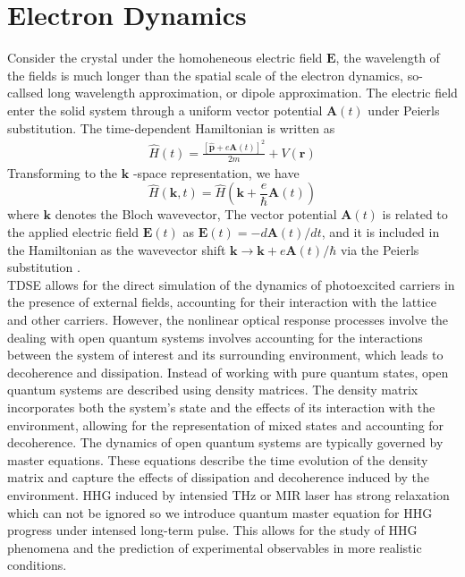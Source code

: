 \section{Electron Dynamics}
Consider the crystal under the homoheneous electric field $\mathbf {E}$, the wavelength of the fields
is much longer than the spatial scale of the electron dynamics, so-callsed long wavelength approximation, or dipole approximation. The electric field enter the solid system through a uniform
vector potential $\mathbf {A} (t)$ under Peierls substitution\cite{hofstadter1976energy}. The time-dependent Hamiltonian is written as
\begin{align}
	\hat{H}(t)=\frac{[\hat{\mathbf{p}}+e \mathbf{A}(t)]^{2}}{2 m}+V(\mathbf{r})
\end{align}
Transforming to the $\mathbf{k}$ -space representation, we have
\begin{equation}
	\hat{H}(\mathbf{k}, t)=\hat{H}\left(\mathbf{k}+\frac{e}{\hbar} \mathbf{A}(t)\right)
	\label{eqn:vTD}
\end{equation}
where $\mathbf k$ denotes the Bloch wavevector, The vector potential $\mathbf A(t)$ is related to the applied electric field $\mathbf E(t)$ as $\mathbf E(t)=-d\mathbf A(t)/dt$, and it is included in the Hamiltonian as the wavevector shift $\mathbf k \rightarrow \mathbf k + e\mathbf A(t)/\hbar$ via the Peierls substitution  \cite{hofstadter1976energy}.\\
\color{red}
\gls{TDSE} allows for the direct simulation of the dynamics of photoexcited carriers in the presence of external fields, accounting for their interaction with the lattice and other carriers.
However, the nonlinear optical response processes involve the dealing with open quantum systems involves accounting for the interactions between the system of interest and its surrounding environment, which leads to decoherence and dissipation. Instead of working with pure quantum states, open quantum systems are described using density matrices. The density matrix incorporates both the system's state and the effects of its interaction with the environment, allowing for the representation of mixed states and accounting for decoherence. The dynamics of open quantum systems are typically governed by master equations. These equations describe the time evolution of the density matrix and capture the effects of dissipation and decoherence induced by the environment.
HHG induced by intensied THz or MIR laser has strong relaxation which can not be ignored so we introduce quantum master equation for HHG progress under intensed long-term pulse. This allows for the study of \gls{HHG} phenomena and the prediction of experimental observables in more realistic conditions.
\color{black}
